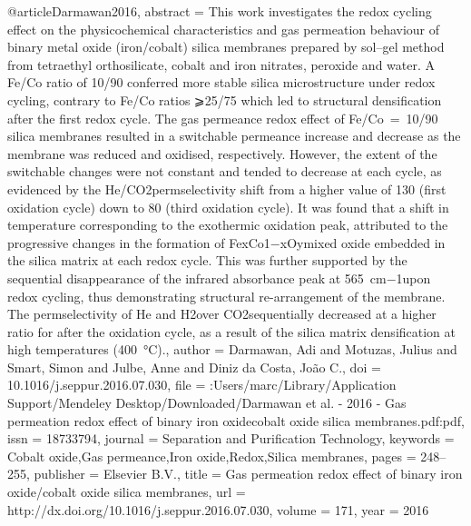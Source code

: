 @article{Darmawan2016,
abstract = {This work investigates the redox cycling effect on the physicochemical characteristics and gas permeation behaviour of binary metal oxide (iron/cobalt) silica membranes prepared by sol–gel method from tetraethyl orthosilicate, cobalt and iron nitrates, peroxide and water. A Fe/Co ratio of 10/90 conferred more stable silica microstructure under redox cycling, contrary to Fe/Co ratios ⩾25/75 which led to structural densification after the first redox cycle. The gas permeance redox effect of Fe/Co = 10/90 silica membranes resulted in a switchable permeance increase and decrease as the membrane was reduced and oxidised, respectively. However, the extent of the switchable changes were not constant and tended to decrease at each cycle, as evidenced by the He/CO2permselectivity shift from a higher value of 130 (first oxidation cycle) down to 80 (third oxidation cycle). It was found that a shift in temperature corresponding to the exothermic oxidation peak, attributed to the progressive changes in the formation of FexCo1−xOymixed oxide embedded in the silica matrix at each redox cycle. This was further supported by the sequential disappearance of the infrared absorbance peak at 565 cm−1upon redox cycling, thus demonstrating structural re-arrangement of the membrane. The permselectivity of He and H2over CO2sequentially decreased at a higher ratio for after the oxidation cycle, as a result of the silica matrix densification at high temperatures (400 °C).},
author = {Darmawan, Adi and Motuzas, Julius and Smart, Simon and Julbe, Anne and {Diniz da Costa}, Jo{\~{a}}o C.},
doi = {10.1016/j.seppur.2016.07.030},
file = {:Users/marc/Library/Application Support/Mendeley Desktop/Downloaded/Darmawan et al. - 2016 - Gas permeation redox effect of binary iron oxidecobalt oxide silica membranes.pdf:pdf},
issn = {18733794},
journal = {Separation and Purification Technology},
keywords = {Cobalt oxide,Gas permeance,Iron oxide,Redox,Silica membranes},
pages = {248--255},
publisher = {Elsevier B.V.},
title = {{Gas permeation redox effect of binary iron oxide/cobalt oxide silica membranes}},
url = {http://dx.doi.org/10.1016/j.seppur.2016.07.030},
volume = {171},
year = {2016}
}
